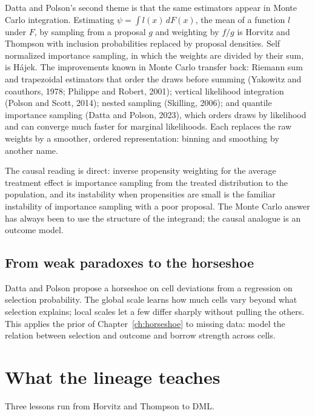 Datta and Polson's second theme is that the same estimators appear in Monte Carlo integration. Estimating $\psi = \int l(x)\,dF(x)$, the mean of a function $l$ under $F$, by sampling from a proposal $g$ and weighting by $f/g$ is Horvitz and Thompson with inclusion probabilities replaced by proposal densities. Self normalized importance sampling, in which the weights are divided by their sum, is H\'ajek. The improvements known in Monte Carlo transfer back: Riemann sum and trapezoidal estimators that order the draws before summing (Yakowitz and coauthors, 1978; Philippe and Robert, 2001); vertical likelihood integration (Polson and Scott, 2014); nested sampling (Skilling, 2006); and quantile importance sampling (Datta and Polson, 2023), which orders draws by likelihood and can converge much faster for marginal likelihoods. Each replaces the raw weights by a smoother, ordered representation: binning and smoothing by another name.

The causal reading is direct: inverse propensity weighting for the average treatment effect is importance sampling from the treated distribution to the population, and its instability when propensities are small is the familiar instability of importance sampling with a poor proposal. The Monte Carlo answer has always been to use the structure of the integrand; the causal analogue is an outcome model.

\subsection{From weak paradoxes to the horseshoe}

Datta and Polson propose a horseshoe on cell deviations from a regression on selection probability. The global scale learns how much cells vary beyond what selection explains; local scales let a few differ sharply without pulling the others. This applies the prior of Chapter~\ref{ch:horseshoe} to missing data: model the relation between selection and outcome and borrow strength across cells.

\section{What the lineage teaches}

Three lessons run from Horvitz and Thompson to DML.

